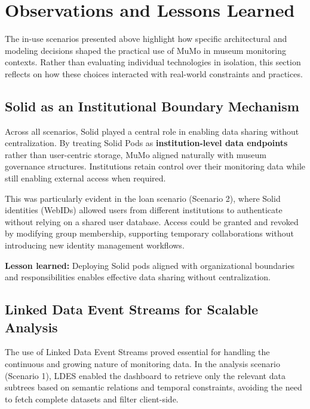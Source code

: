 \documentclass{ceurart}
\begin{document}
\section{Observations and Lessons Learned}\label{sec:lessons}

The in-use scenarios presented above highlight how specific
architectural and modeling decisions shaped the practical use of MuMo in
museum monitoring contexts. Rather than evaluating individual
technologies in isolation, this section reflects on how these choices
interacted with real-world constraints and practices.

\subsection{Solid as an Institutional Boundary
Mechanism}\label{solid-as-an-institutional-boundary-mechanism}

Across all scenarios, Solid played a central role in enabling data
sharing without centralization. By treating Solid Pods as
\textbf{institution-level data endpoints} rather than user-centric
storage, MuMo aligned naturally with museum governance structures.
Institutions retain control over their monitoring data while still
enabling external access when required.

This was particularly evident in the loan scenario (Scenario 2), where
Solid identities (WebIDs) allowed users from different institutions to
authenticate without relying on a shared user database. Access could be
granted and revoked by modifying group membership, supporting temporary
collaborations without introducing new identity management workflows.

\textbf{Lesson learned:} Deploying Solid pods aligned with
organizational boundaries and responsibilities enables effective data
sharing without centralization.

\subsection{Linked Data Event Streams for Scalable
Analysis}\label{linked-data-event-streams-for-scalable-analysis}

The use of Linked Data Event Streams proved essential for handling the
continuous and growing nature of monitoring data. In the analysis
scenario (Scenario 1), LDES enabled the dashboard to retrieve only the
relevant data subtrees based on semantic relations and temporal
constraints, avoiding the need to fetch complete datasets and filter
client-side.
\end{document}
